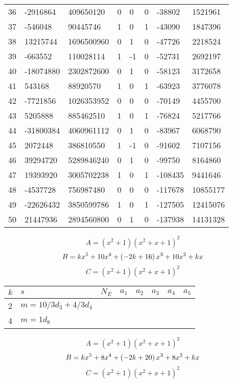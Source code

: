 \documentclass{amsart}
\begin{document}
\begin{longtable}{|l|l|l|lllll|}
36&-2916864&409650120&0&0&0&-38802&1521961\\
37&-546048&90445746&1&0&1&-43090&1847396\\
38&13215744&1696500960&0&1&0&-47726&2218524\\
39&-663552&110028114&1&-1&0&-52731&2692197\\
40&-18074880&2302872600&0&1&0&-58123&3172658\\
41&543168&88920570&1&0&1&-63923&3776078\\
42&-7721856&1026353952&0&0&0&-70149&4455700\\
43&5205888&885462510&1&0&1&-76824&5217766\\
44&-31800384&4060961112&0&1&0&-83967&6068790\\
45&2072448&386810550&1&-1&0&-91602&7107156\\
46&39294720&5289846240&0&1&0&-99750&8164860\\
47&19393920&3005702238&1&0&1&-108435&9441646\\
48&-4537728&756987480&0&0&0&-117678&10855177\\
49&-22626432&3850599786&1&0&1&-127505&12415076\\
50&21447936&2894560800&0&1&0&-137938&14131328\\
\hline
\end{longtable}
$$A=(x^2
 + 1)(x^2
 + x
 + 1)^{2}$$
$$B=k\*x^5
 + 10\*x^4
 + \left(-2\*k
 + 16\right) \*x^3
 + 10\*x^2
 + k\*x$$
$$C=(x^2
 + 1)(x^2
 + x
 + 1)^{2}$$
\begin{longtable}{|l|l|l|lllll|}
\hline
$k$ & $s$ & $N_E$ & $a_1$ & $a_2$ & $a_3$ & $a_4$ & $a_5$\\
\hline
2&$m=10/3d_{3}+4/3d_{4}$&&\multicolumn{5}{c|}{}\\
4&$m=1d_{8}$&&\multicolumn{5}{c|}{}\\
\hline
\end{longtable}
$$A=(x^2
 + 1)(x^2
 + x
 + 1)^{2}$$
$$B=k\*x^5
 + 8\*x^4
 + \left(-2\*k
 + 20\right) \*x^3
 + 8\*x^2
 + k\*x$$
$$C=(x^2
 + 1)(x^2
 + x
 + 1)^{2}$$
\end{document}
